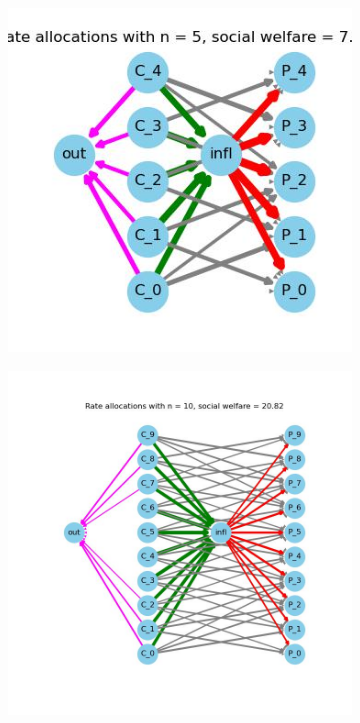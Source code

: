\documentclass[11pt, letterpaper]{article}
\begin{document}
\begin{figure}[!h]
    \centering
    \begin{subfigure}[b]{0.2\textwidth}
        \includegraphics[width=\linewidth]{figures/n/5_allocs.jpg}
    \end{subfigure}
    \begin{subfigure}[b]{0.4\textwidth}
        \includegraphics[width=\linewidth]{figures/n/10_allocs.jpg}

\end{subfigure}
\end{figure}
\end{document}
